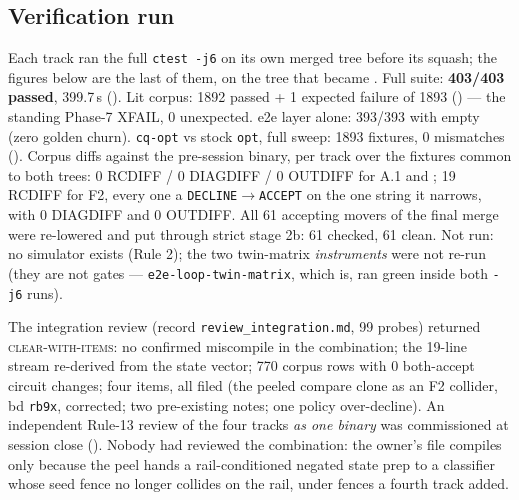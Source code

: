 \subsection*{Verification run}
Each track ran the full \texttt{ctest -j6} on its own merged tree before its squash; the figures below are
the last of them, on the tree that became . Full suite: \textbf{403/403 passed}, 399.7\,s
(). Lit corpus: 1892 passed + 1 expected failure of 1893
() --- the standing Phase-7 XFAIL, 0 unexpected. e2e layer alone: 393/393
with  empty (zero golden churn). \texttt{cq-opt} vs stock
\texttt{opt}, full sweep: 1893 fixtures, 0 mismatches
(). Corpus diffs against the pre-session
binary, per track over the fixtures common to both trees: 0 RCDIFF / 0 DIAGDIFF / 0 OUTDIFF for A.1 and
; 19 RCDIFF for F2, every one a \texttt{DECLINE}\(\to\)\texttt{ACCEPT} on the one string it
narrows, with 0 DIAGDIFF and 0 OUTDIFF. All 61 accepting movers of the final merge were re-lowered and put
through strict stage 2b: 61 checked, 61 clean. Not run: no simulator exists (Rule 2); the two twin-matrix
\emph{instruments} were not re-run (they are not gates --- \texttt{e2e-loop-twin-matrix}, which is, ran
green inside both \texttt{-j6} runs).

The integration review (record \texttt{review\_integration.md}, 99 probes) returned \textsc{clear-with-items}: no confirmed miscompile in the combination; the 19-line stream re-derived from the state vector; 770 corpus rows with 0 both-accept circuit changes; four items, all filed (the peeled compare clone as an F2 collider, bd \texttt{rb9x}, corrected; two pre-existing notes; one policy over-decline).
An independent Rule-13 review of the four tracks \emph{as one binary} was commissioned at session close
(). Nobody had reviewed the
combination: the owner's file compiles only because the peel hands a rail-conditioned negated state prep
to a classifier whose seed fence no longer collides on the rail, under fences a fourth track added.

